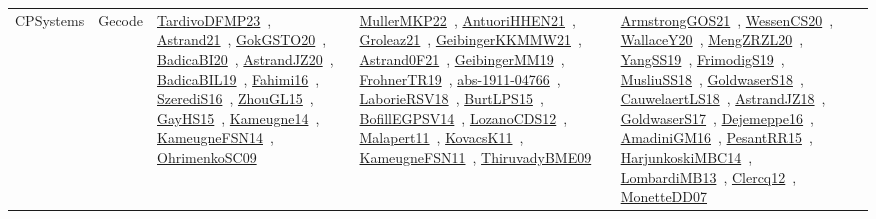 {\begin{longtable}{lp{3cm}>{\raggedright\arraybackslash}p{6cm}>{\raggedright\arraybackslash}p{6cm}>{\raggedright\arraybackslash}p{8cm}}
CPSystems & Gecode & \href{../works/TardivoDFMP23.pdf}{TardivoDFMP23}~\cite{TardivoDFMP23}, \href{../works/Astrand21.pdf}{Astrand21}~\cite{Astrand21}, \href{../works/GokGSTO20.pdf}{GokGSTO20}~\cite{GokGSTO20}, \href{../works/BadicaBI20.pdf}{BadicaBI20}~\cite{BadicaBI20}, \href{../works/AstrandJZ20.pdf}{AstrandJZ20}~\cite{AstrandJZ20}, \href{../works/BadicaBIL19.pdf}{BadicaBIL19}~\cite{BadicaBIL19}, \href{../works/Fahimi16.pdf}{Fahimi16}~\cite{Fahimi16}, \href{../works/SzerediS16.pdf}{SzerediS16}~\cite{SzerediS16}, \href{../works/ZhouGL15.pdf}{ZhouGL15}~\cite{ZhouGL15}, \href{../works/GayHS15.pdf}{GayHS15}~\cite{GayHS15}, \href{../works/Kameugne14.pdf}{Kameugne14}~\cite{Kameugne14}, \href{../works/KameugneFSN14.pdf}{KameugneFSN14}~\cite{KameugneFSN14}, \href{../works/OhrimenkoSC09.pdf}{OhrimenkoSC09}~\cite{OhrimenkoSC09} & \href{../works/MullerMKP22.pdf}{MullerMKP22}~\cite{MullerMKP22}, \href{../works/AntuoriHHEN21.pdf}{AntuoriHHEN21}~\cite{AntuoriHHEN21}, \href{../works/Groleaz21.pdf}{Groleaz21}~\cite{Groleaz21}, \href{../works/GeibingerKKMMW21.pdf}{GeibingerKKMMW21}~\cite{GeibingerKKMMW21}, \href{../works/Astrand0F21.pdf}{Astrand0F21}~\cite{Astrand0F21}, \href{../works/GeibingerMM19.pdf}{GeibingerMM19}~\cite{GeibingerMM19}, \href{../works/FrohnerTR19.pdf}{FrohnerTR19}~\cite{FrohnerTR19}, \href{../works/abs-1911-04766.pdf}{abs-1911-04766}~\cite{abs-1911-04766}, \href{../works/LaborieRSV18.pdf}{LaborieRSV18}~\cite{LaborieRSV18}, \href{../works/BurtLPS15.pdf}{BurtLPS15}~\cite{BurtLPS15}, \href{../works/BofillEGPSV14.pdf}{BofillEGPSV14}~\cite{BofillEGPSV14}, \href{../works/LozanoCDS12.pdf}{LozanoCDS12}~\cite{LozanoCDS12}, \href{../works/Malapert11.pdf}{Malapert11}~\cite{Malapert11}, \href{../works/KovacsK11.pdf}{KovacsK11}~\cite{KovacsK11}, \href{../works/KameugneFSN11.pdf}{KameugneFSN11}~\cite{KameugneFSN11}, \href{../works/ThiruvadyBME09.pdf}{ThiruvadyBME09}~\cite{ThiruvadyBME09} & \href{../works/ArmstrongGOS21.pdf}{ArmstrongGOS21}~\cite{ArmstrongGOS21}, \href{../works/WessenCS20.pdf}{WessenCS20}~\cite{WessenCS20}, \href{../works/WallaceY20.pdf}{WallaceY20}~\cite{WallaceY20}, \href{../works/MengZRZL20.pdf}{MengZRZL20}~\cite{MengZRZL20}, \href{../works/YangSS19.pdf}{YangSS19}~\cite{YangSS19}, \href{../works/FrimodigS19.pdf}{FrimodigS19}~\cite{FrimodigS19}, \href{../works/MusliuSS18.pdf}{MusliuSS18}~\cite{MusliuSS18}, \href{../works/GoldwaserS18.pdf}{GoldwaserS18}~\cite{GoldwaserS18}, \href{../works/CauwelaertLS18.pdf}{CauwelaertLS18}~\cite{CauwelaertLS18}, \href{../works/AstrandJZ18.pdf}{AstrandJZ18}~\cite{AstrandJZ18}, \href{../works/GoldwaserS17.pdf}{GoldwaserS17}~\cite{GoldwaserS17}, \href{../works/Dejemeppe16.pdf}{Dejemeppe16}~\cite{Dejemeppe16}, \href{../works/AmadiniGM16.pdf}{AmadiniGM16}~\cite{AmadiniGM16}, \href{../works/PesantRR15.pdf}{PesantRR15}~\cite{PesantRR15}, \href{../works/HarjunkoskiMBC14.pdf}{HarjunkoskiMBC14}~\cite{HarjunkoskiMBC14}, \href{../works/LombardiMB13.pdf}{LombardiMB13}~\cite{LombardiMB13}, \href{../works/Clercq12.pdf}{Clercq12}~\cite{Clercq12}, \href{../works/MonetteDD07.pdf}{MonetteDD07}~\cite{MonetteDD07}\\

\end{longtable}}
